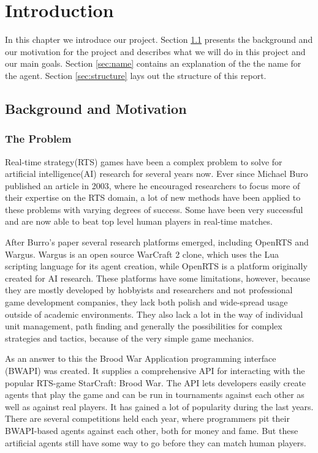 
\chapter{Introduction}
In this chapter we introduce our project. Section \ref{sec:background} presents the background and our motivation for the project and describes what we will do in this project and our main goals. Section \ref{sec:name} contains an explanation of the the name for the agent. Section \ref{sec:structure} lays out the structure of this report.

\section{Background and Motivation}
\label{sec:background}

\subsection{The Problem}
Real-time strategy(RTS) games have been a complex problem to solve for artificial intelligence(AI) research for several years now. Ever since Michael Buro published an article in 2003\cite{buro2003real}, where he encouraged researchers to focus more of their expertise on the RTS domain, a lot of new methods have been applied to these problems with varying degrees of success. Some have been very successful and are now able to beat top level human players in real-time matches.\cite{campbell2002deep}

After Burro's paper several research platforms emerged, including OpenRTS\cite{buro2003orts} and Wargus\cite{wargus}. Wargus is an open source WarCraft 2 clone, which uses the Lua scripting language for its agent creation, while OpenRTS is a platform originally created for AI research. These platforms have some limitations, however, because they are mostly developed by hobbyists and researchers and not professional game development companies, they lack both polish and wide-spread usage outside of academic environments. They also lack a lot in the way of individual unit management, path finding and generally the possibilities for complex strategies and tactics, because of the very simple game mechanics.

As an answer to this the Brood War Application programming interface (BWAPI) was created. It supplies a comprehensive API for interacting with the popular RTS-game StarCraft: Brood War. The API lets developers easily create agents that play the game and can be run in tournaments against each other as well as against real players. It has gained a lot of popularity during the last years.\cite{bwapi} There are several competitions held each year, where programmers pit their BWAPI-based agents against each other, both for money and fame.\cite{sscait} But these artificial agents still have some way to go before they can match human players.\cite{eisbotvsfong}

